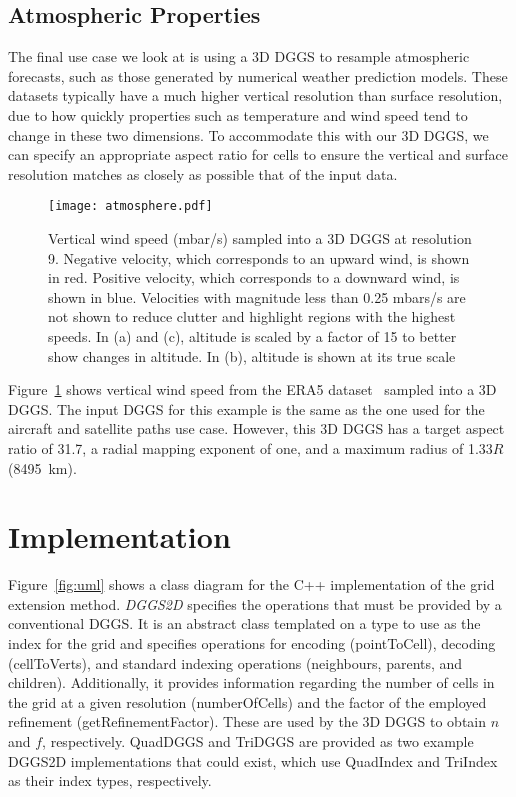 \subsection{Atmospheric Properties}
The final use case we look at is using a 3D DGGS to resample atmospheric forecasts, such as those generated by numerical weather prediction models.
These datasets typically have a much higher vertical resolution than surface resolution, due to how quickly properties such as temperature and wind speed tend to change in these two dimensions.
To accommodate this with our 3D DGGS, we can specify an appropriate aspect ratio for cells to ensure the vertical and surface resolution matches as closely as possible that of the input data.


\begin{figure}[ht!]
	\centering
	\texttt{[image: atmosphere.pdf]}
	\caption[Atmospheric properties resampling use case showing vertical wind speed]{
		Vertical wind speed (mbar/s) sampled into a 3D DGGS at resolution 9.
		Negative velocity, which corresponds to an upward wind, is shown in red.
		Positive velocity, which corresponds to a downward wind, is shown in blue.
		Velocities with magnitude less than 0.25 mbars/s are not shown to reduce clutter and highlight regions with the highest speeds.
		In (a) and (c), altitude is scaled by a factor of 15 to better show changes in altitude.
		In (b), altitude is shown at its true scale
	}
	\label{fig:atmosphere}
\end{figure}


Figure~\ref{fig:atmosphere} shows vertical wind speed from the ERA5 dataset~\cite{era5} sampled into a 3D DGGS.
The input DGGS for this example is the same as the one used for the aircraft and satellite paths use case.
However, this 3D DGGS has a target aspect ratio of 31.7, a radial mapping exponent of one, and a maximum radius of 1.33$R$ (8495~km).


\section{Implementation} \label{chap:8:impl}
Figure~\ref{fig:uml} shows a class diagram for the C++ implementation of the grid extension method. \textit{DGGS2D} specifies the operations that must be provided by a conventional DGGS. It is an abstract class templated on a type to use as the index for the grid and specifies operations for encoding (pointToCell), decoding (cellToVerts), and standard indexing operations (neighbours, parents, and children). Additionally, it provides information regarding the number of cells in the grid at a given resolution (numberOfCells) and the factor of the employed refinement (getRefinementFactor). These are used by the 3D DGGS to obtain $n$ and $f$, respectively. QuadDGGS and TriDGGS are provided as two example DGGS2D implementations that could exist, which use QuadIndex and TriIndex as their index types, respectively.


